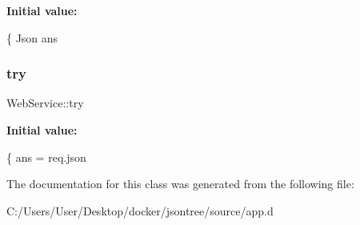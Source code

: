 {\bfseries Initial value\+:}
\begin{DoxyCode}
\{
        Json ans
\end{DoxyCode}
\mbox{\label{class_web_service_a95a7724bd31a4bb0e22960c5cb91dae6}} 
\subsubsection{try}
{\footnotesize\ttfamily Web\+Service\+::try}

{\bfseries Initial value\+:}
\begin{DoxyCode}
\{
            ans = req.json
\end{DoxyCode}


The documentation for this class was generated from the following file\+:\begin{DoxyCompactItemize}
\item 
C\+:/\+Users/\+User/\+Desktop/docker/jsontree/source/app.\+d\end{DoxyCompactItemize}
